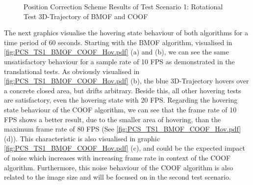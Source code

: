 \begin{figure}[H]
\hfill
{}
\begin{center}
\end{center}
\caption{Position Correction Scheme Results of Test Scenario 1: Rotational Test 3D-Trajectory of BMOF and COOF}
\label{fig:PCS_TS1_BMOF_COOF_Rot.pdf}
\end{figure}

The next graphics visualise the hovering state behaviour of both algorithms for a time period of 60 seconds.
Starting with the \gls{BMOF} algorithm, visualised in \ref{fig:PCS_TS1_BMOF_COOF_Hov.pdf} (a) and (b), we can see the same unsatisfactory behaviour for a sample rate of 10 \gls{FPS} as demonstrated in the translational tests. As obviously visualised in 
\ref{fig:PCS_TS1_BMOF_COOF_Hov.pdf} (b), the blue 3D-Trajectory hovers over a concrete closed area, but drifts arbitrary.
Beside this, all other hovering tests are satisfactory, even the hovering state with 20 \gls{FPS}. Regarding the hovering state behaviour of the \gls{COOF} algorithm, we can see that the frame rate of 10 \gls{FPS} shows a better result, due to the smaller area of hovering, than the maximum frame rate of 80 \gls{FPS} (See \ref{fig:PCS_TS1_BMOF_COOF_Hov.pdf} (d)). This characteristic is also visualised in graphic 
\ref{fig:PCS_TS1_BMOF_COOF_Hov.pdf} (c), and could be the expected impact of noise which increases with increasing frame rate in context of the \gls{COOF} algorithm. Furthermore, this noise behaviour of the \gls{COOF} algorithm is also related to the image size and will be focused on in the second test scenario.

